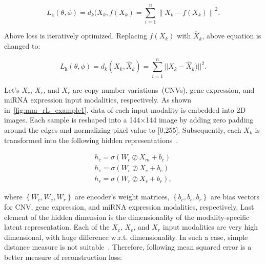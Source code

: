 \begin{equation}
    L_{\mathrm{k}}(\theta, \phi)=\text{$d_{k}$}(X_{k}, f(X_{k}) = \sum_{i=1}^{n} \left\|X_{k}-f(X_{k})\right\|^{2}.
\end{equation}

\hspace*{3.5mm} Above loss is iteratively optimized. Replacing $f(X_{k})$ with $\hat{X}_{k}$, above equation is changed to: 

\begin{equation}
    L_{\mathrm{k}}(\theta, \phi)=\text{$d_{k}$}(X_{k}, \hat{X}_{k}) = \sum_{i=1}^{n} ||X_{k}-\hat{X}_{k})||^{2}.
\end{equation}

\hspace*{3.5mm} Let's $X_c$, $X_e$, and $X_r$ are copy number variations~(CNVs), gene expression, and miRNA expression input modalities, respectively. As shown in~\cref{fig:mm_rL_example1}, data of each input modality is embedded into 2D images. Each sample is reshaped into a 144$\times$144 image by adding zero padding around the edges and normalizing pixel value to [0,255]. Subsequently, each $X_k$ is transformed into the following hidden representations~\cite{KarimIEEEAccess2019}.

\begin{equation}
    \begin{array}{l}
        {h_{c}=\sigma \left(W_{c} \oslash X_{m}+b_{c}\right)} \\
        {h_{e}=\sigma \left(W_{e} \oslash X_{e}+b_{e}\right)} \\
        {h_{r}=\sigma \left(W_{r} \oslash X_{r}+b_{r}\right),}
    \end{array}
\end{equation}  

\hspace*{3.5mm} where $\left\{W_{c}, W_{e}, W_{r}\right\}$ are encoder's weight matrices, $\left\{b_{c}, b_{e}, b_{r}\right\}$ are bias vectors for CNV, gene expression, and miRNA expression modalities, respectively. Last element of the hidden dimension is the dimensionality of the modality-specific latent representation. Each of the $X_c$, $X_e$, and $X_r$ input modalities are very high dimensional, with huge difference w.r.t. dimensionality. In such a case, simple distance measure is not suitable~\cite{thiam2020multimodal}. Therefore, following mean squared error is a better measure of reconstruction loss:  

